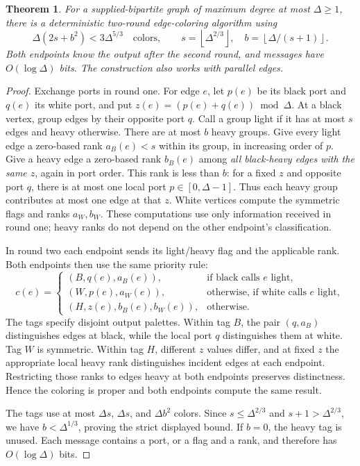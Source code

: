 \documentclass[11pt]{article}
\newtheorem{theorem}{Theorem}[section]
\theoremstyle{definition}
\theoremstyle{remark}
\newcommand{\floor}[1]{\left\lfloor #1\right\rfloor}
\begin{document}
\begin{theorem}\label{thm:tworounds}
For a supplied-bipartite graph of maximum degree at most $\Delta\ge1$,
there is a deterministic two-round edge-coloring algorithm using
\[
 \Delta(2s+b^2)<3\Delta^{5/3}\quad\text{colors},\qquad
 s=\floor{\Delta^{2/3}},\quad b=\floor{\Delta/(s+1)}.
\]
Both endpoints know the output after the second round, and messages have
$O(\log\Delta)$ bits. The construction also works with parallel edges.
\end{theorem}
\begin{proof}
Exchange ports in round one. For edge $e$, let $p(e)$ be its black port
and $q(e)$ its white port, and put $z(e)=(p(e)+q(e))\bmod\Delta$.
At a black vertex, group edges by their opposite port $q$. Call a group
light if it has at most $s$ edges and heavy otherwise. There are at most
$b$ heavy groups. Give every light edge a zero-based rank $a_B(e)<s$
within its group, in increasing order of $p$. Give a heavy edge a
zero-based rank $b_B(e)$ among \emph{all black-heavy edges with the same
$z$}, again in port order. This rank is less than $b$: for a fixed $z$
and opposite port $q$, there is at most one local port $p\in[0,\Delta-1]$.
Thus each heavy group contributes at most one edge at that $z$.
White vertices compute the symmetric flags and ranks $a_W,b_W$.
These computations use only information received in round one; heavy
ranks do not depend on the other endpoint's classification.

In round two each endpoint sends its light/heavy flag and the applicable
rank. Both endpoints then use the same priority rule:
\[
 c(e)=
 \begin{cases}
 (B,q(e),a_B(e)),&\text{if black calls $e$ light},\\
 (W,p(e),a_W(e)),&\text{otherwise, if white calls $e$ light},\\
 (H,z(e),b_B(e),b_W(e)),&\text{otherwise}.
 \end{cases}
\]
The tags specify disjoint output palettes. Within tag $B$, the pair
$(q,a_B)$ distinguishes edges at black, while the local port $q$
distinguishes them at white. Tag $W$ is symmetric. Within tag $H$,
different $z$ values differ, and at fixed $z$ the appropriate local
heavy rank distinguishes incident edges at each endpoint. Restricting
those ranks to edges heavy at both endpoints preserves distinctness.
Hence the coloring is proper and both endpoints compute the same result.

The tags use at most $\Delta s$, $\Delta s$, and $\Delta b^2$ colors.
Since $s\le\Delta^{2/3}$ and $s+1>\Delta^{2/3}$, we have
$b<\Delta^{1/3}$, proving the strict displayed bound. If $b=0$, the
heavy tag is unused. Each message contains a port, or a flag and a rank,
and therefore has $O(\log\Delta)$ bits.
\end{proof}
\end{document}
